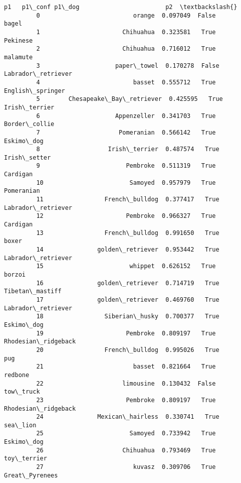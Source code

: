 \documentclass[11pt]{article}
\begin{document}
\begin{Verbatim}[commandchars=\\\{\}]
                                        p1   p1\_conf p1\_dog                        p2  \textbackslash{}
         0                          orange  0.097049  False                     bagel   
         1                       Chihuahua  0.323581   True                  Pekinese   
         2                       Chihuahua  0.716012   True                  malamute   
         3                     paper\_towel  0.170278  False        Labrador\_retriever   
         4                          basset  0.555712   True          English\_springer   
         5        Chesapeake\_Bay\_retriever  0.425595   True             Irish\_terrier   
         6                     Appenzeller  0.341703   True             Border\_collie   
         7                      Pomeranian  0.566142   True                Eskimo\_dog   
         8                   Irish\_terrier  0.487574   True              Irish\_setter   
         9                        Pembroke  0.511319   True                  Cardigan   
         10                        Samoyed  0.957979   True                Pomeranian   
         11                 French\_bulldog  0.377417   True        Labrador\_retriever   
         12                       Pembroke  0.966327   True                  Cardigan   
         13                 French\_bulldog  0.991650   True                     boxer   
         14               golden\_retriever  0.953442   True        Labrador\_retriever   
         15                        whippet  0.626152   True                    borzoi   
         16               golden\_retriever  0.714719   True           Tibetan\_mastiff   
         17               golden\_retriever  0.469760   True        Labrador\_retriever   
         18                 Siberian\_husky  0.700377   True                Eskimo\_dog   
         19                       Pembroke  0.809197   True       Rhodesian\_ridgeback   
         20                 French\_bulldog  0.995026   True                       pug   
         21                         basset  0.821664   True                   redbone   
         22                      limousine  0.130432  False                 tow\_truck   
         23                       Pembroke  0.809197   True       Rhodesian\_ridgeback   
         24               Mexican\_hairless  0.330741   True                  sea\_lion   
         25                        Samoyed  0.733942   True                Eskimo\_dog   
         26                      Chihuahua  0.793469   True               toy\_terrier   
         27                         kuvasz  0.309706   True            Great\_Pyrenees   

\end{Verbatim}
\end{document}
